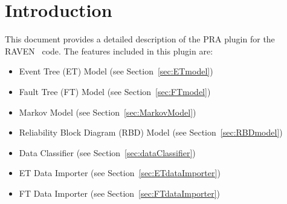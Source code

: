 \section{Introduction}
\label{sec:Introduction}

This document provides a detailed description of the PRA plugin for the RAVEN~\cite{RAVEN,RAVENtheoryMan} code.
The features included in this plugin are:
\begin{itemize}
	\item Event Tree (ET) Model (see Section~\ref{sec:ETmodel}) 
	\item Fault Tree (FT) Model (see Section~\ref{sec:FTmodel})
	\item Markov Model (see Section~\ref{sec:MarkovModel})
	\item Reliability Block Diagram (RBD) Model (see Section~\ref{sec:RBDmodel})
	\item Data Classifier (see Section~\ref{sec:dataClassifier})
	\item ET Data Importer (see Section~\ref{sec:ETdataImporter}) 
	\item FT Data Importer (see Section~\ref{sec:FTdataImporter})
\end{itemize}